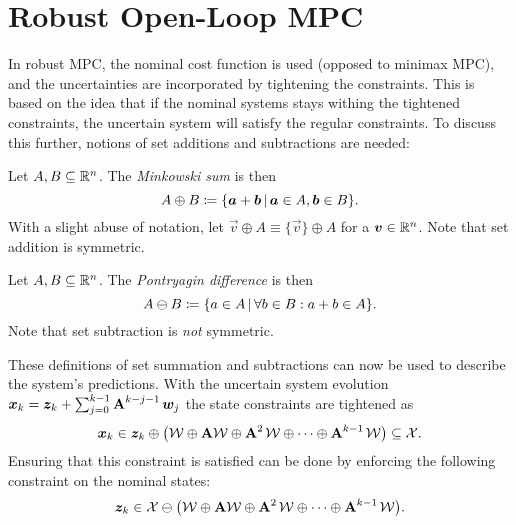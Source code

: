 	\section{Robust Open-Loop MPC}
		\label{sec:robustOpenLoopMpc}

		In robust MPC, the nominal cost function is used (opposed to minimax MPC), and the uncertainties are incorporated by tightening the constraints. This is based on the idea that if the nominal systems stays withing the tightened constraints, the uncertain system will satisfy the regular constraints. To discuss this further, notions of set additions and subtractions are needed:
		\begin{definition}
			Let \( A, B \subseteq \mathbb{R}^n \). The \emph{Minkowski sum} is then
			\begin{equation}
				A \oplus B \coloneqq \{ \bm{a} + \bm{b} \,\vert\, \bm{a} \in A, \bm{b} \in B \}.
			\end{equation}
			With a slight abuse of notation, let \( \vec{v} \oplus A \equiv \{ \vec{v} \} \oplus A \) for a \( \bm{v} \in \mathbb{R}^n \). Note that set addition is symmetric.
		\end{definition}
		\begin{definition}
			Let \( A, B \subseteq \mathbb{R}^n \). The \emph{Pontryagin difference} is then
			\begin{equation}
				A \ominus B \coloneqq \{ a \in A \,\vert\, \forall b \in B : a + b \in A \}.
			\end{equation}
			Note that set subtraction is \emph{not} symmetric.
		\end{definition}
		These definitions of set summation and subtractions can now be used to describe the system's predictions. With the uncertain system evolution \( \bm{x}_k = \bm{z}_k + \sum_{j = 0}^{k - 1} \bm{\mathrm{A}}^{k - j - 1\,} \bm{w}_j \) the state constraints are tightened as
		\begin{equation}
			\bm{x}_k \in \bm{z}_k \oplus \bigl( \mathcal{W} \oplus \bm{\mathrm{A}} \mathcal{W} \oplus \bm{\mathrm{A}}^{2\,} \mathcal{W} \oplus \cdots \oplus \bm{\mathrm{A}}^{k - 1\,} \mathcal{W} \bigr) \subseteq \mathcal{X}.
		\end{equation}
		Ensuring that this constraint is satisfied can be done by enforcing the following constraint on the nominal states:
		\begin{equation}
			\bm{z}_k \in \mathcal{X} \ominus \bigl( \mathcal{W} \oplus \bm{\mathrm{A}} \mathcal{W} \oplus \bm{\mathrm{A}}^{2\,} \mathcal{W} \oplus \cdots \oplus \bm{\mathrm{A}}^{k - 1\,} \mathcal{W} \bigr).
		\end{equation}
